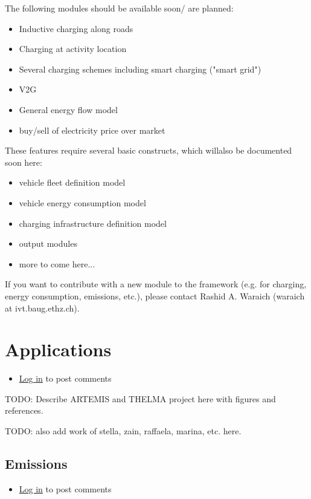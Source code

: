 \documentclass[a4paper,11pt]{report}
\begin{document}
The following modules should be available soon/ are planned:
\begin{itemize}
	\item Inductive charging along roads
	\item Charging at activity location
	\item Several charging schemes including smart charging ("smart grid")
	\item V2G
	\item General energy flow model
	\item buy/sell of electricity price over market
\end{itemize}

These features require several basic constructs, which willalso be documented soon here:
\begin{itemize}
	\item vehicle fleet definition model
	\item vehicle energy consumption model
	\item charging infrastructure definition model
	\item output modules
	\item more to come here...
\end{itemize}

If you want to contribute with a new module to the framework  (e.g. for charging, energy consumption, emissions, etc.), please contact  Rashid A. Waraich (waraich at ivt.baug.ethz.ch).

\vfill\eject
\chapter{Applications}
\begin{itemize}
	\item \href{http://www.matsim.org/user/login?destination=comment/reply/720%23comment-form}{Log in} to post comments
\end{itemize}

TODO: Describe ARTEMIS and THELMA project here with figures and references.



TODO: also add work of stella, zain, raffaela, marina, etc. here.

\vfill\eject
\section{Emissions}
\begin{itemize}
	\item \href{http://www.matsim.org/user/login?destination=comment/reply/719%23comment-form}{Log in} to post comments
\end{itemize}
\end{document}
